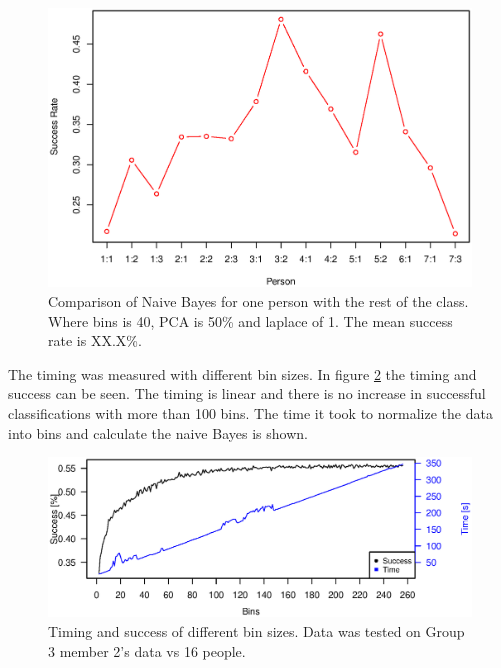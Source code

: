 \begin{figure}[H]
\centering
\includegraphics[width = \textwidth]{graphics/graph_baye_comparison}
\caption{Comparison of Naive Bayes for one person with the rest of the class.
Where bins is 40, PCA is 50\% and laplace of 1. The mean success rate is XX.X\%.}
\label{fig:comp_naiveBayes}
\end{figure}

The timing was measured with different bin sizes. 
In figure \ref{fig:baye_timing} the timing and success can be seen.
The timing is linear and there is no increase in successful classifications with more than 100 bins. 
The time it took to normalize the data into bins and calculate the naive Bayes is shown.

\begin{figure}
\centering
\includegraphics[width = \textwidth]{graphics/baye_timing_bins}
\caption[Timing with different bin sizes]{Timing and success of different bin sizes. Data was tested on Group 3 member 2's data vs 16 people.}
\label{fig:baye_timing}
\end{figure}
